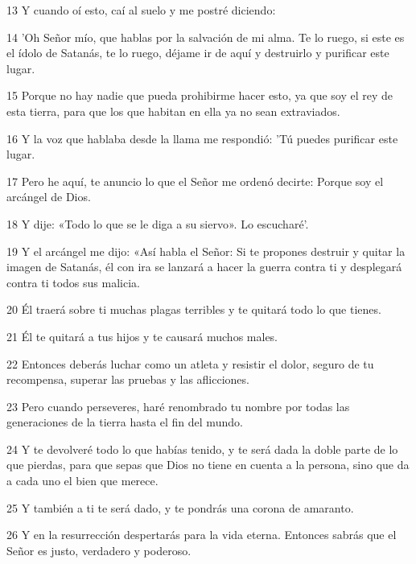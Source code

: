 \par 13 Y cuando oí esto, caí al suelo y me postré diciendo:

\par 14 'Oh Señor mío, que hablas por la salvación de mi alma. Te lo ruego, si este es el ídolo de Satanás, te lo ruego, déjame ir de aquí y destruirlo y purificar este lugar.

\par 15 Porque no hay nadie que pueda prohibirme hacer esto, ya que soy el rey de esta tierra, para que los que habitan en ella ya no sean extraviados.

\par 16 Y la voz que hablaba desde la llama me respondió: 'Tú puedes purificar este lugar.

\par 17 Pero he aquí, te anuncio lo que el Señor me ordenó decirte: Porque soy el arcángel de Dios.

\par 18 Y dije: «Todo lo que se le diga a su siervo». Lo escucharé'.

\par 19 Y el arcángel me dijo: «Así habla el Señor: Si te propones destruir y quitar la imagen de Satanás, él con ira se lanzará a hacer la guerra contra ti y desplegará contra ti todos sus malicia.

\par 20 Él traerá sobre ti muchas plagas terribles y te quitará todo lo que tienes.

\par 21 Él te quitará a tus hijos y te causará muchos males.

\par 22 Entonces deberás luchar como un atleta y resistir el dolor, seguro de tu recompensa, superar las pruebas y las aflicciones.

\par 23 Pero cuando perseveres, haré renombrado tu nombre por todas las generaciones de la tierra hasta el fin del mundo.

\par 24 Y te devolveré todo lo que habías tenido, y te será dada la doble parte de lo que pierdas, para que sepas que Dios no tiene en cuenta a la persona, sino que da a cada uno el bien que merece.

\par 25 Y también a ti te será dado, y te pondrás una corona de amaranto.

\par 26 Y en la resurrección despertarás para la vida eterna. Entonces sabrás que el Señor es justo, verdadero y poderoso.


